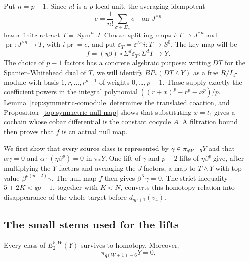 Put $n=p-1$. Since $n!$ is a $p$-local unit, the averaging idempotent
\[
 e=\frac1{n!}\sum_{\sigma\in\Sigma_n}\sigma
 \quad\text{on }J^{\wedge n}
\]
has a finite retract $T=\operatorname{Sym}^{n}J$.
Choose splitting maps $i:T\to J^{\wedge n}$ and
$\operatorname{pr}:J^{\wedge n}\to T$, with
$i\operatorname{pr}=e$, and put
$\varepsilon_T=\varepsilon^{\wedge n}i:T\to S^0$.
The key map will be
\[
 f=(\eta\beta)\circ\Sigma^d\varepsilon_T:\Sigma^dT\longrightarrow Y.
\]
The choice of $p-1$ factors has a concrete algebraic purpose:
writing $DT$ for the Spanier--Whitehead dual of $T$, we will identify
$BP_*(DT\wedge Y)$ as a free $R/I_4$-module with basis
$1,r,\ldots,r^{p-1}$ of weights $0,\ldots,p-1$.
These supply exactly the coefficient powers in the integral polynomial
$((r+x)^p-r^p-x^p)/p$.
Lemma~\ref{top:symmetric-comodule} determines the translated coaction,
and Proposition~\ref{top:symmetric-null-map} shows that substituting
$x=t_1$ gives a cochain whose cobar differential is the constant
cocycle $A$. A filtration bound then proves that $f$ is an actual
null map.

We first show that every source class is represented by
$\gamma\in\pi_{qW-5}Y$ and that
$\alpha\gamma=0$ and $\alpha\cdot(\eta\beta^p)=0$ in $\pi_*Y$.
One lift of $\gamma$ and $p-2$ lifts of $\eta\beta^p$ give, after
multiplying the $Y$ factors and averaging the $J$ factors, a map to
$T\wedge Y$ with top value $\beta^{p(p-2)}\gamma$.
The null map $f$ then gives $\beta^K\gamma=0$.
The strict inequality $5+2K<qp+1$, together with $K<N$, converts
this homotopy relation into disappearance of the whole target before
$d_{qp+1}(v_4)$.

\subsection{The small stems used for the lifts}

\begin{lemma}
\label{top:small-stems}
Every class of $E_2^{5,W}(Y)$ survives to homotopy. Moreover,
\begin{equation}
\label{top:alpha-gamma-vanishing}
 \pi_{q(W+1)-6}Y=0.
\end{equation}
\end{lemma}

